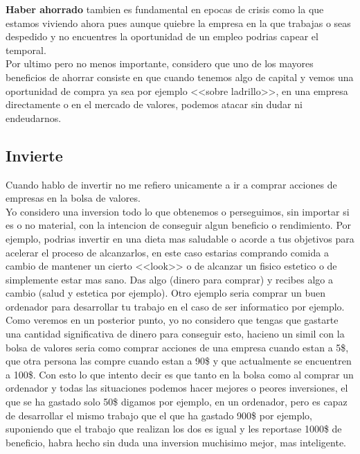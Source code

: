\textbf{Haber ahorrado} tambien es fundamental en epocas de crisis como la que estamos viviendo ahora pues aunque quiebre la empresa en la que trabajas o seas despedido y no encuentres la oportunidad de un empleo podrias capear el temporal.\\

Por ultimo pero no menos importante, considero que uno de los mayores beneficios de ahorrar consiste en que cuando tenemos algo de capital y vemos una oportunidad de compra ya sea por ejemplo <<sobre ladrillo>>, en una empresa directamente o en el mercado de valores, podemos atacar sin dudar ni endeudarnos.

\subsection{Invierte}

Cuando hablo de invertir no me refiero unicamente a ir a comprar acciones de empresas en la bolsa de valores. \\

Yo considero una inversion todo lo que obtenemos o perseguimos, sin importar si es o no material, con la intencion de conseguir algun beneficio o rendimiento. Por ejemplo, podrias invertir en una dieta mas saludable o acorde a tus objetivos para acelerar el proceso de alcanzarlos, en este caso estarias comprando comida a cambio de mantener un cierto <<look>> o de alcanzar un fisico estetico o de simplemente estar mas sano. Das algo (dinero para comprar) y recibes algo a cambio (salud y estetica por ejemplo). Otro ejemplo seria comprar un buen ordenador para desarrollar tu trabajo en el caso de ser informatico por ejemplo. Como veremos en un posterior punto, yo no considero que tengas que gastarte una cantidad significativa de dinero para conseguir esto, hacieno un simil con la bolsa de valores seria como comprar acciones de una empresa cuando estan a 5\$, que otra persona las compre cuando estan a 90\$ y que actualmente se encuentren a 100\$. Con esto lo que intento decir es que tanto en la bolsa como al comprar un ordenador y todas las situaciones podemos hacer mejores o peores inversiones, el que se ha gastado solo 50\$ digamos por ejemplo, en un ordenador, pero es capaz de desarrollar el mismo trabajo que el que ha gastado 900\$ por ejemplo, suponiendo que el trabajo que realizan los dos es igual y les reportase 1000\$ de beneficio, habra hecho sin duda una inversion muchisimo mejor, mas inteligente.\\

